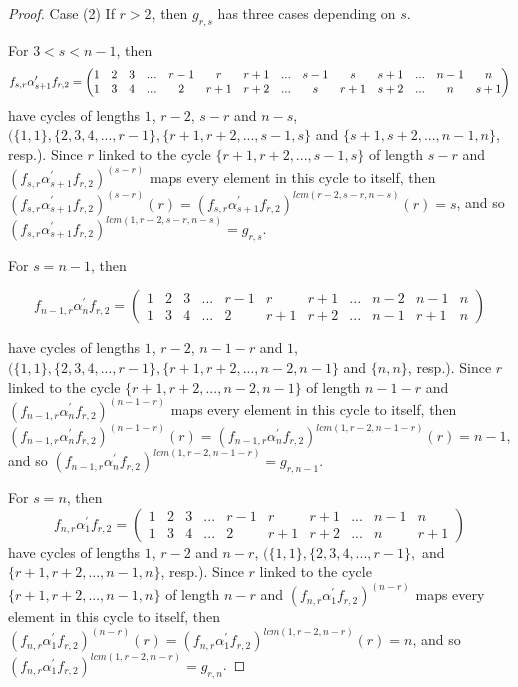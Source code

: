 \documentclass[10pt,a4paper]{amsart}
\begin{document}
\begin{proof}
\vspace{1cm}
Case (2) If $r>2$, then $g_{r,s}$ has three cases depending on $s$.

\vspace{0.5cm}
For $3<s<n-1$, then 
$$f_{s,r} \alpha^{\prime}_{s+1}f_{r,2}=
\setcounter{MaxMatrixCols}{14}
\begin{pmatrix}
1&2&3&...&r-1&r&r+1&...&s-1&s&s+1&...&n-1&n\\1&3&4&...&2&r+1&r+2&...&s&r+1&s+2&...&n&s+1
\end{pmatrix}$$
have cycles of lengths $1$, $r-2$, $s-r$ and $n-s$, $( \{1,1\}, \{2,3,4,...,r-1\}, \{r+1,r+2,...,s-1,s\}$ and $\{s+1,s+2,...,n-1,n\}$, resp.). Since $r$ linked to the cycle $\{r+1,r+2,...,s-1,s\}$ of length $s-r$ and $(f_{s,r} \alpha^{\prime}_{s+1}f_{r,2})^{(s-r)}$ maps every element in this cycle to itself, then $(f_{s,r} \alpha^{\prime}_{s+1}f_{r,2})^{(s-r)}(r)=(f_{s,r} \alpha^{\prime}_{s+1}f_{r,2})^{lcm(r-2,s-r,n-s)}(r)=s$, and so $(f_{s,r} \alpha^{\prime}_{s+1}f_{r,2})^{lcm(1,r-2,s-r,n-s)}=g_{r,s}$.

\vspace{0.5cm}
For $s=n-1$, then

$$f_{n-1,r} \alpha^{\prime}_{n}f_{r,2}=
\begin{pmatrix}  
1&2&3&...&r-1&r&r+1&...&n-2&n-1&n\\1&3&4&...&2&r+1&r+2&...&n-1&r+1&n
\end{pmatrix}$$ 


have cycles of lengths $1$, $r-2$, $n-1-r$ and $1$,  $( \{1,1\}, \{2,3,4,...,r-1\}, \{r+1,r+2,...,n-2,n-1\}$ and $\{n,n\}$, resp.). Since $r$ linked to the cycle $\{r+1,r+2,...,n-2,n-1\}$ of length $n-1-r$ and $(f_{n-1,r} \alpha^{\prime}_{n}f_{r,2})^{(n-1-r)}$ maps every element in this cycle to itself, then $(f_{n-1,r} \alpha^{\prime}_{n}f_{r,2})^{(n-1-r)}(r)=(f_{n-1,r} \alpha^{\prime}_{n}f_{r,2})^{lcm(1,r-2,n-1-r)}(r)=n-1$, and so $(f_{n-1,r} \alpha^{\prime}_{n}f_{r,2})^{lcm(1,r-2,n-1-r)}=g_{r,n-1}$.

\vspace{0.5cm}
For $s=n$, then 
$$f_{n,r} \alpha^{\prime}_{1}f_{r,2}=
\begin{pmatrix}  
1&2&3&...&r-1&r&r+1&...&n-1&n\\1&3&4&...&2&r+1&r+2&...&n&r+1
\end{pmatrix}$$
have cycles of lengths $1$, $r-2$ and $n-r$, $( \{1,1\}, \{2,3,4,...,r-1\},$ and $\{r+1,r+2,...,n-1,n\}$, resp.). Since $r$ linked to the cycle $\{r+1,r+2,...,n-1,n\}$ of length $n-r$ and $(f_{n,r} \alpha^{\prime}_{1}f_{r,2})^{(n-r)}$ maps every element in this cycle to itself, then $(f_{n,r} \alpha^{\prime}_{1}f_{r,2})^{(n-r)}(r)=(f_{n,r} \alpha^{\prime}_{1}f_{r,2})^{lcm(1,r-2,n-r)}(r)=n$,
and so $(f_{n,r} \alpha^{\prime}_{1}f_{r,2})^{lcm(1,r-2,n-r)}=g_{r,n}$.


\end{proof}
\end{document}

